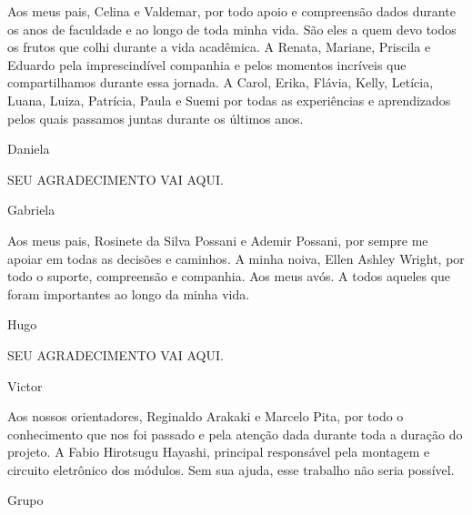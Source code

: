 Aos meus pais, Celina e Valdemar, por todo apoio e compreensão dados durante os anos de faculdade e ao longo de toda minha vida. São eles a quem devo todos os frutos que colhi durante a vida acadêmica.
A Renata, Mariane, Priscila e Eduardo pela imprescindível companhia e pelos momentos incríveis que compartilhamos durante essa jornada.
A Carol, Erika, Flávia, Kelly, Letícia, Luana, Luiza, Patrícia, Paula e Suemi por todas as experiências e aprendizados pelos quais passamos juntas durante os últimos anos.
\begin{flushright}
    Daniela
\end{flushright}

SEU AGRADECIMENTO VAI AQUI.
\begin{flushright}
    Gabriela
\end{flushright}

Aos meus pais, Rosinete da Silva Possani e Ademir Possani, por sempre me apoiar em todas as decisões e caminhos. A minha noiva, Ellen Ashley Wright, por todo o suporte, compreensão e companhia. Aos meus avós. A todos aqueles que foram importantes ao longo da minha vida.
\begin{flushright}
    Hugo
\end{flushright}

SEU AGRADECIMENTO VAI AQUI.
\begin{flushright}
    Victor
\end{flushright}

Aos nossos orientadores, Reginaldo Arakaki e Marcelo Pita, por todo o conhecimento que nos foi passado e pela atenção dada durante toda a duração do projeto.
A Fabio Hirotsugu Hayashi, principal responsável pela montagem e circuito eletrônico dos módulos. Sem sua ajuda, esse trabalho não seria possível.
\begin{flushright}
    Grupo
\end{flushright}
